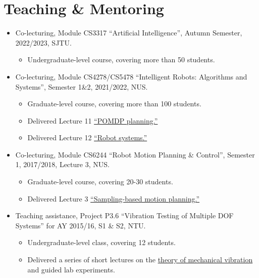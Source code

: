 \documentclass[10pt,letterpaper,sans]{moderncv}        %
\begin{document}


\section{Teaching \& Mentoring}
{\begin{itemize}
    \item Co-lecturing, Module CS3317 ``Artificial Intelligence'', Autumn Semester, 2022/2023, SJTU.
    \begin{itemize}
        \item Undergraduate-level course, covering more than 50 students.
    \end{itemize}
    \item Co-lecturing, Module CS4278/CS5478 ``Intelligent Robots: Algorithms and Systems'', Semester 1\&2, 2021/2022, NUS.
    \begin{itemize}
        \item Graduate-level course, covering more than 100 students.
        \item Delivered Lecture 11 \underline{``POMDP planning.''}
        \item Delivered Lecture 12 \underline{``Robot systems.''}
    \end{itemize}
    \item Co-lecturing, Module CS6244 ``Robot Motion Planning \& Control'', Semester 1, 2017/2018, Lecture 3, NUS.
    \begin{itemize}
        \item Graduate-level course, covering 20-30 students.
        \item Delivered Lecture 3 \underline{``Sampling-based motion planning.''}
    \end{itemize}
    \item Teaching assistance, Project P3.6 ``Vibration Testing of Multiple DOF Systems'' for AY 2015/16, S1 \& S2, NTU.
    \begin{itemize}
        \item Undergraduate-level class, covering 12 students.
        \item Delivered a series of short lectures on the \underline{theory of mechanical vibration} and guided lab experiments.
    \end{itemize}
\end{itemize}}
\end{document}
